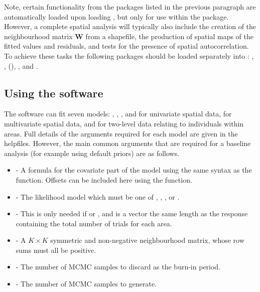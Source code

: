 \documentclass[article,shortnames,nojss]{jss}
\begin{document}
\hspace{1cm} Note, certain functionality from the packages listed in the previous paragraph are automatically loaded upon loading , but only for use within the package. However, a complete spatial analysis will typically also include the creation of the neighbourhood matrix $\mathbf{W}$ from a shapefile, the production of spatial maps of the fitted values and residuals, and tests for the presence of spatial autocorrelation. To achieve these tasks the following packages should be loaded separately into : , ,  (\citealp{rgdal}), ,  and .



\subsection{Using the software}
The software can fit  seven models: ,  , ,  and  for univariate spatial data,   for multivariate spatial data, and  for two-level data relating to individuals within areas. Full details of the arguments required for each model are given in the helpfiles. However, the main common arguments that are required for a baseline analysis (for example using default priors) are as follows.

\begin{itemize}
\item {} - A formula for the covariate part of the model using the same syntax as the  function. Offsets can be included here using the  function.

\item {} - The likelihood model which must  be one of , , ,  or .

\item {} - This is only needed if   or , and is a vector the same length as the response containing the total number of trials  for each area. 

\item {} - A $K \times K$ symmetric and non-negative neighbourhood matrix, whose row sums must all be positive.

\item {} - The number of MCMC samples to discard as the burn-in period.
    
\item {} - The number of MCMC samples to generate.
\end{itemize}
\end{document}
